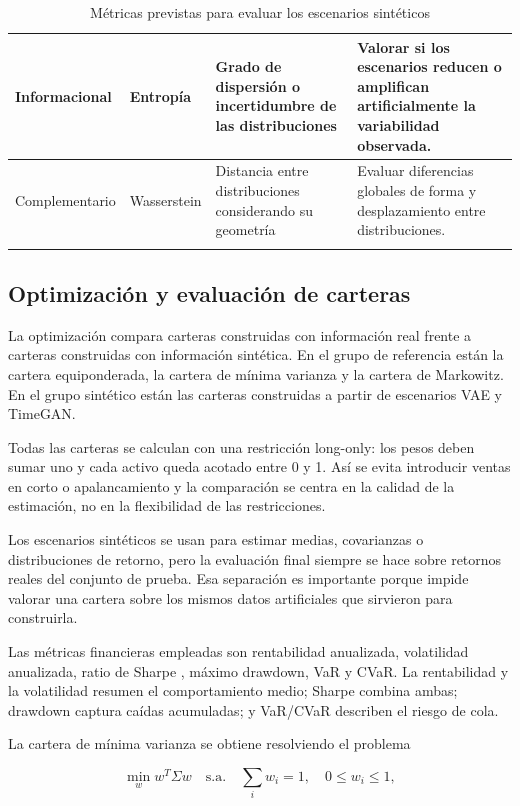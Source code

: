 \documentclass[11pt,a4paper,spanish,oneside]{book}
\numberwithin{equation}{chapter}
\numberwithin{figure}{chapter}
\begin{document}
{\begin{longtable}{|p{}|p{}|p{}|p{}|}
Informacional & Entropía & Grado de dispersión o incertidumbre de las distribuciones & Valorar si los escenarios reducen o amplifican artificialmente la variabilidad observada. \\
\hline

Complementario & Wasserstein & Distancia entre distribuciones considerando su geometría & Evaluar diferencias globales de forma y desplazamiento entre distribuciones. \\
\hline

\caption{Métricas previstas para evaluar los escenarios sintéticos}
\label{tab:metricas-escenarios}

\end{longtable}
}

\subsection{Optimización y evaluación de carteras}

La optimización compara carteras construidas con información real frente a carteras construidas con información sintética. En el grupo de referencia están la cartera equiponderada, la cartera de mínima varianza y la cartera de Markowitz. En el grupo sintético están las carteras construidas a partir de escenarios VAE y TimeGAN.

Todas las carteras se calculan con una restricción long-only: los pesos deben sumar uno y cada activo queda acotado entre 0 y 1. Así se evita introducir ventas en corto o apalancamiento y la comparación se centra en la calidad de la estimación, no en la flexibilidad de las restricciones.

Los escenarios sintéticos se usan para estimar medias, covarianzas o distribuciones de retorno, pero la evaluación final siempre se hace sobre retornos reales del conjunto de prueba. Esa separación es importante porque impide valorar una cartera sobre los mismos datos artificiales que sirvieron para construirla.

Las métricas financieras empleadas son rentabilidad anualizada, volatilidad anualizada, ratio de Sharpe \cite{Sharpe1964}, máximo drawdown, VaR y CVaR. La rentabilidad y la volatilidad resumen el comportamiento medio; Sharpe combina ambas; drawdown captura caídas acumuladas; y VaR/CVaR describen el riesgo de cola.

La cartera de mínima varianza se obtiene resolviendo el problema

\begin{equation}
\min_w w^T \Sigma w \quad \text{s.a.} \quad \sum_i w_i = 1, \quad 0 \leq w_i \leq 1,
\end{equation}
\end{document}
